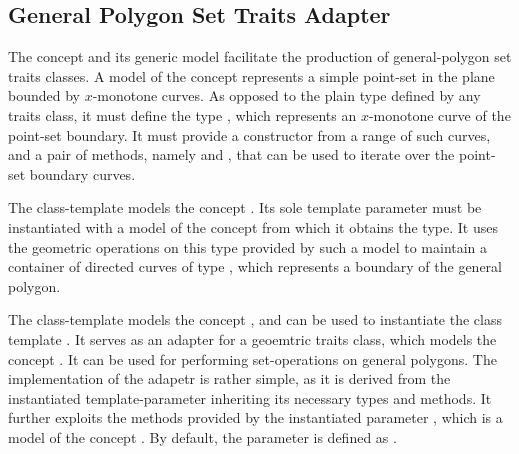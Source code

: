 
\subsection{General Polygon Set Traits Adapter\label{bso_ssec:general_polygon_concept}}

The concept  and its generic model 
 facilitate the 
production of general-polygon set traits classes. A model of the concept 
 represents a simple point-set in the plane bounded 
by $x$-monotone curves. As opposed to the plain  type 
defined by any traits class, it must define the type 
, which represents an $x$-monotone curve of the 
point-set boundary. It must provide a constructor from a range of such 
curves, and a pair of methods, namely  and 
, that can be used to iterate over the point-set boundary 
curves.
 
The class-template 
models the concept . Its sole template parameter
must be instantiated with a model of the concept
 from which it obtains the 
 type. It uses the geometric  operations
on this type provided by such a model to maintain a container of
directed curves of type , which represents a  
boundary of the general polygon.

The class-template
models the concept , and can be used to
instantiate the class template .
It serves as an adapter for a geoemtric traits class, which models the
concept .
It can be used for performing set-operations on general polygons.
The implementation of the adapetr is rather simple, as it is derived
from the instantiated template-parameter 
inheriting its necessary types and methods. It further exploits 
the methods provided by the instantiated parameter
, which is a model of the concept
. By default, the  parameter
is defined as
.

